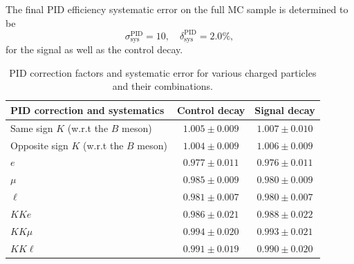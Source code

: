 The final PID efficiency systematic error on the full MC sample is determined to be
\begin{equation}
\sigma_{\mathrm{sys}}^{\mathrm{PID}} = 10,\quad \delta_{\mathrm{sys}}^{\mathrm{PID}} = 2.0\%,
\end{equation}
for the signal as well as the control decay.

\begin{table}[H]
	\centering
	\begin{tabular}{l|c|c}
		PID correction and systematics & Control decay & Signal decay \\
		\toprule
		Same sign $K$ (w.r.t the $B$ meson) & $1.005\pm 0.009$ & $1.007\pm 0.010$\\
		Opposite sign $K$ (w.r.t the $B$ meson) & $1.004\pm 0.009$ & $1.006\pm 0.009$\\
		$e$ & $0.977\pm 0.011$ & $0.976\pm 0.011$\\
		$\mu$ & $0.985\pm 0.009$ & $0.980\pm 0.009$\\
		$\ell$ & $0.981\pm 0.007$ & $0.980\pm 0.007$\\
		\midrule
		$KKe$ & $0.986 \pm 0.021$ & $0.988\pm 0.022$\\
		$KK\mu$ & $0.994 \pm 0.020$ & $0.993\pm 0.021$\\
		\midrule
		$KK\ell$ & $0.991 \pm 0.019$ & $0.990\pm 0.020$\\
		\bottomrule
	\end{tabular}
	\captionsetup{width=0.8\linewidth}
	\caption{PID correction factors and systematic error for various charged particles and their combinations.}
	\label{tab:PID}
\end{table}

